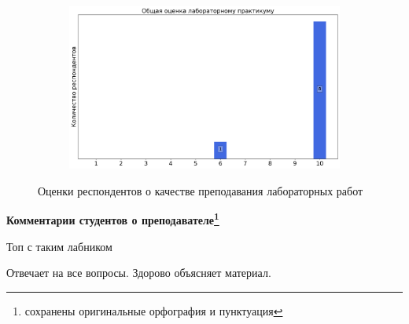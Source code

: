 \begin{figure}[H]
\begin{subfigure}[b]{0.45\textwidth}
			\end{subfigure}
			\begin{subfigure}[b]{0.45\textwidth}
				\centering
				\includegraphics[width=\textwidth]{images/1 course/Общая физика - механика/labniks-marks-Суханова Е.В.-3.png}
			\end{subfigure}	
			\caption{Оценки респондентов о качестве преподавания лабораторных работ}
		\end{figure}

		\textbf{Комментарии студентов о преподавателе\protect\footnote{сохранены оригинальные орфография и пунктуация}}
            \begin{commentbox} 
                Топ с таким лабником  
            \end{commentbox} 
        
            \begin{commentbox} 
                Отвечает на все вопросы. Здорово объясняет материал. 
            \end{commentbox}


